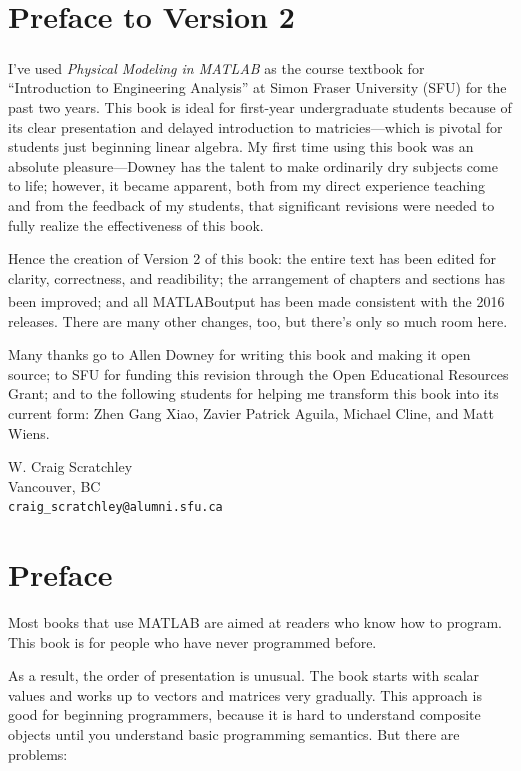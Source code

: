\documentclass[
]{book}
\newcommand{\myreg}{\textsuperscript{{\tiny \textregistered}}}
\newcommand{\thetitle}{Physical Modeling in MATLAB\myreg}
\begin{document}
\chapter {Preface to Version 2}

I've used \textit{\thetitle} as the course
textbook for ``Introduction to Engineering Analysis'' at Simon Fraser
University (SFU) for the past two years. This book is ideal for
first-year undergraduate students because of its clear presentation and
delayed introduction to matricies---which is pivotal for students
just beginning linear algebra.  My first time using this book was an
absolute pleasure---Downey has the talent to make ordinarily dry
subjects come to life; however, it became apparent, both from my direct
experience teaching and from the feedback of my students, that
significant revisions were needed to fully realize the effectiveness
of this book.

Hence the creation of Version 2 of this book: the entire text
has been edited for clarity, correctness, and readibility; the
arrangement of chapters and sections has been improved;
and all MATLAB\myreg output has been made consistent
with the 2016 releases. There are many other
changes, too, but there's only so much room here.

Many thanks go to Allen Downey for writing this book and making it open
source; to SFU for funding this revision through the Open Educational
Resources Grant; and to the following students for helping me transform
this book into its current form: Zhen Gang Xiao, Zavier Patrick Aguila,
Michael Cline, and Matt Wiens.

\noindent W. Craig Scratchley
\\
\noindent Vancouver, BC
\\
{\tt craig\_scratchley@alumni.sfu.ca}

\newpage

\chapter{Preface}


Most books that use MATLAB are aimed at readers who know how
to program.  This book is for people who have never programmed
before.

As a result, the order of presentation is unusual.  The book starts
with scalar values and works up to vectors and matrices very
gradually.  This approach is good for beginning programmers, because
it is hard to understand composite objects until you understand basic
programming semantics.  But there are problems:
\end{document}
